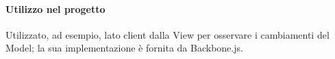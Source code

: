 \documentclass[../PianoDiQualifica.tex]{subfiles}
\begin{document}
				\paragraph{Utilizzo nel progetto\\}
					Utilizzato, ad esempio, lato client dalla View per osservare i cambiamenti del
					Model; la sua implementazione è fornita da Backbone.js.
\end{document}
